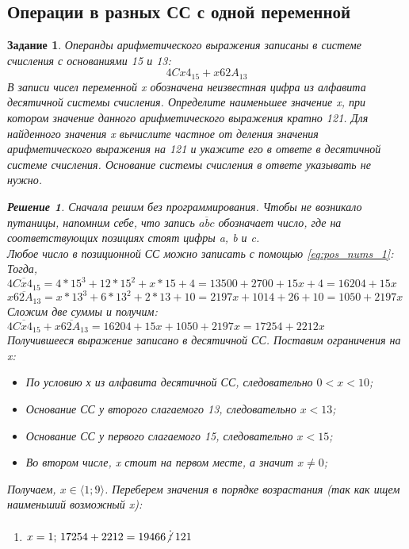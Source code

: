 \documentclass[12pt]{article}
\theoremstyle{problem_style}
\newtheorem{problem}{Задание}[subsection]
\newtheorem{solution}{Решение}[subsection]
\begin{document}
\subsection{Операции в разных СС с одной переменной}\label{sec:one_var_many_base}
\begin{problem}
Операнды арифметического выражения записаны в системе счисления с основаниями 15 и 13:
\[4Cx4_{15} + x62A_{13}\]
В записи чисел переменной x обозначена неизвестная цифра из алфавита десятичной системы счисления. Определите наименьшее значение x, при котором значение данного арифметического выражения кратно 121. Для найденного значения x вычислите частное от деления значения арифметического выражения на 121 и укажите его в ответе в десятичной системе счисления. Основание системы счисления в ответе указывать не нужно.
\begin{solution}
Сначала решим без программирования. Чтобы не возникало путаницы, напомним себе, что запись $\overline{abc}$ обозначает число, где на соответствующих позициях стоят цифры a, b и c.\\ Любое число в позиционной СС можно записать с помощью \autoref{eq:pos_nums_1}:\\ Тогда, \(\overline{4Cx4_{15}} = 4 * 15^3 + 12 * 15^2 + x * 15 + 4 = 13500 + 2700 + 15x + 4 = 16204 + 15x\)\\ \(\overline{x62A_{13}} = x * 13^3 + 6 * 13^2 + 2 * 13 + 10 = 2197x + 1014 + 26 + 10 = 1050 + 2197x\)\\
Сложим две суммы и получим:\\
\(\overline{4Cx4_{15}} + \overline{x62A_{13}} = 16204 + 15x + 1050 + 2197x = 17254 + 2212x\)\\
Получившееся выражение записано в десятичной СС. Поставим ограничения на x:
\begin{itemize}
    \item По условию х из алфавита десятичной СС, следовательно $0 < x < 10$;
    \item Основание СС у второго слагаемого 13, следовательно $x < 13$;
    \item Основание СС у первого слагаемого 15, следовательно $x < 15$;
    \item Во втором числе, x стоит на первом месте, а значит $x \neq 0$;
\end{itemize}
Получаем, $x \in \langle 1; 9 \rangle $. Переберем значения в порядке возрастания (так как ищем наименьший возможный x):
\begin{enumerate}
    \item $x = 1;\, 17254 + 2212 = 19466 \centernot\vdots 121$

\end{enumerate}
\end{solution}
\end{problem}
\end{document}
